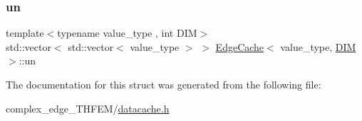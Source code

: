 \mbox{\label{struct_edge_cache_a8c2a3c7fe9bb3530f6412b6c7b22d810}} 
\subsubsection{\texorpdfstring{un}{un}}
{\footnotesize\ttfamily template$<$typename value\+\_\+type , int D\+IM$>$ \\
std\+::vector$<$ std\+::vector$<$ value\+\_\+type $>$ $>$ \mbox{\hyperlink{struct_edge_cache}{Edge\+Cache}}$<$ value\+\_\+type, \mbox{\hyperlink{complex__node___t_h_f_e_m_2uiexp_8h_a589b8b9bfdf714f736059845d568b597}{D\+IM}} $>$\+::un}



The documentation for this struct was generated from the following file\+:\begin{DoxyCompactItemize}
\item 
complex\+\_\+edge\+\_\+\+T\+H\+F\+E\+M/\mbox{\hyperlink{complex__edge___t_h_f_e_m_2datacache_8h}{datacache.\+h}}\end{DoxyCompactItemize}
